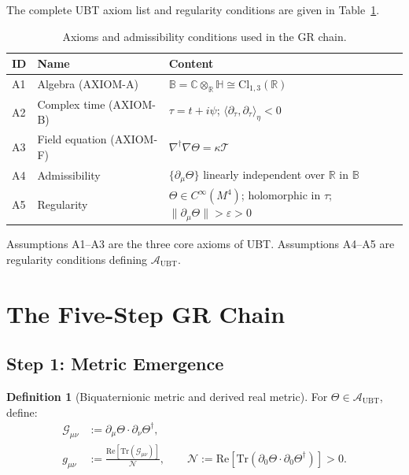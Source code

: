 \documentclass[12pt,a4paper]{article}
\theoremstyle{definition}
\newtheorem{definition}[theorem]{Definition}
\theoremstyle{remark}
\newcommand{\BB}{\mathbb{B}}
\newcommand{\CC}{\mathbb{C}}
\newcommand{\RR}{\mathbb{R}}
\newcommand{\HH}{\mathbb{H}}
\newcommand{\Tr}{\mathrm{Tr}}
\newcommand{\re}{\mathrm{Re}}
\newcommand{\calA}{\mathcal{A}}
\newcommand{\calG}{\mathcal{G}}
\newcommand{\calN}{\mathcal{N}}
\newcommand{\calT}{\mathcal{T}}
\begin{document}
The complete UBT axiom list and regularity conditions are given in
Table~\ref{tab:axioms}.

\begin{table}[ht]
\centering
\caption{Axioms and admissibility conditions used in the GR chain.}
\label{tab:axioms}
\begin{tabular}{lll}
\toprule
\textbf{ID} & \textbf{Name} & \textbf{Content} \\
\midrule
A1 & Algebra (AXIOM-A) & $\BB = \CC\otimes_\RR\HH \cong \mathrm{Cl}_{1,3}(\RR)$ \\
A2 & Complex time (AXIOM-B) & $\tau = t+i\psi$; $\langle\partial_\tau,\partial_\tau\rangle_\eta < 0$ \\
A3 & Field equation (AXIOM-F) & $\nabla^\dagger\nabla\Theta = \kappa\calT$ \\
A4 & Admissibility & $\{\partial_\mu\Theta\}$ linearly independent over $\RR$ in $\BB$ \\
A5 & Regularity & $\Theta \in C^\infty(M^4)$; holomorphic in $\tau$;
                   $\|\partial_\mu\Theta\| > \varepsilon > 0$ \\
\bottomrule
\end{tabular}
\end{table}

Assumptions A1--A3 are the three core axioms of UBT.
Assumptions A4--A5 are regularity conditions defining $\calA_{\mathrm{UBT}}$.

\section{The Five-Step GR Chain}
\label{sec:chain}

\subsection{Step 1: Metric Emergence}
\label{sec:step1}

\begin{definition}[Biquaternionic metric and derived real metric]
\label{def:metric}
For $\Theta \in \calA_{\mathrm{UBT}}$, define:
\begin{align}
  \calG_{\mu\nu} &:= \partial_\mu\Theta \cdot \partial_\nu\Theta^\dagger, \\
  g_{\mu\nu} &:= \frac{\re[\Tr(\calG_{\mu\nu})]}{\calN},
  \qquad
  \calN := \re[\Tr(\partial_0\Theta \cdot \partial_0\Theta^\dagger)] > 0.
\end{align}
\end{definition}
\end{document}
